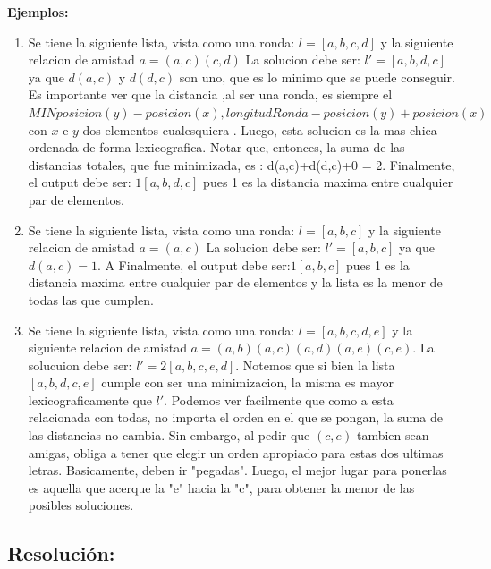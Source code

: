 \documentclass[10pt, a4paper]{article}
\begin{document}
\begin{flushleft}
\textbf{Ejemplos:}\\
\end{flushleft}
\begin{enumerate}

\item

Se tiene la siguiente lista, vista como una ronda:
$l =  [a, b, c, d]$ y la siguiente relacion de amistad $a = {(a,c)(c,d)}$
La solucion debe ser: $l' = [a, b, d, c]$ ya que $d(a,c)$  y $d(d,c)$ son uno, que es lo minimo que se puede conseguir. Es importante ver que la distancia
,al ser una ronda, es siempre el $MIN{posicion(y) - posicion(x),longitudRonda - posicion(y) +posicion(x)}$ con $x$ e $y$  dos elementos cualesquiera .
Luego, esta solucion es la mas chica ordenada de forma lexicografica.
Notar que, entonces, la suma de las distancias totales, que fue minimizada, es : d(a,c)+d(d,c)+0 = 2.
Finalmente, el output debe ser: $1 [a, b, d, c]$ pues 1 es la distancia maxima entre cualquier par de elementos.

\item
Se tiene la siguiente lista, vista como una ronda:
$l = [a, b, c]$ y la siguiente relacion de amistad $a = {(a,c)}$
La solucion debe ser: $l' = [a,b,c]$ ya que $d(a,c) = 1$. A
Finalmente, el output debe ser:$ 1 [a, b, c]$ pues 1 es la distancia maxima entre cualquier par de elementos y la lista es la menor de todas las que cumplen.

\item
Se tiene la siguiente lista, vista como una ronda:
$l = [a,b,c,d,e]$ y la siguiente relacion de amistad $a = {(a,b)(a,c)(a,d)(a,e)(c,e)}$.
La solucuion debe ser: $l' = 2 [a,b,c,e,d]$. Notemos que si bien la lista $[a,b,d,c,e]$ cumple con ser una minimizacion, la misma es mayor lexicograficamente que $l'$. Podemos ver facilmente que como a esta relacionada con todas, no importa el orden en el que se pongan, la suma de las distancias no cambia. Sin embargo, al pedir que $(c,e)$ tambien sean amigas, obliga a tener que elegir un orden apropiado para estas dos ultimas letras. Basicamente, deben ir "pegadas". Luego, el mejor lugar para ponerlas es aquella que acerque la "e" hacia la "c", para obtener la menor de las posibles soluciones.

\end{enumerate}
\subsection{Resolución:} 
\end{document}
